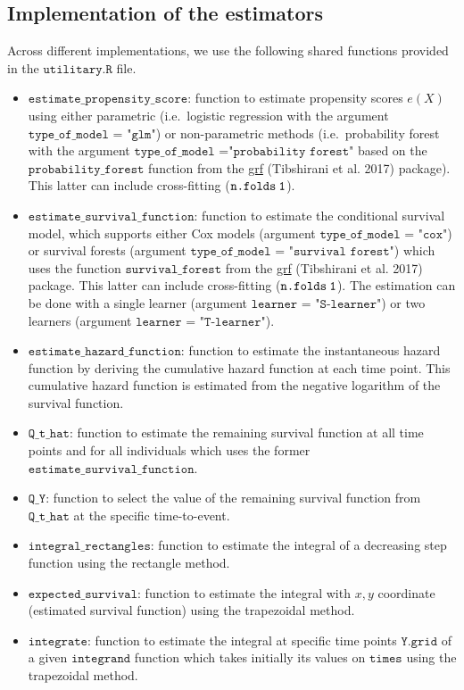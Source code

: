 \documentclass[
  11pt,
  a4paper,
]{article}
\theoremstyle{plain}
\theoremstyle{plain}
\theoremstyle{plain}
\theoremstyle{definition}
\theoremstyle{remark}
\begin{document}
\subsection{Implementation of the
estimators}\label{implementation-of-the-estimators}

Across different implementations, we use the following shared functions
provided in the \(\texttt{utilitary.R}\) file.

\begin{itemize}
\item
  \(\texttt{estimate\_propensity\_score}\): function to estimate
  propensity scores \(e(X)\) using either parametric (i.e.~logistic
  regression with the argument \(\texttt{type\_of\_model = "glm"}\)) or
  non-parametric methods (i.e.~probability forest with the argument
  \(\texttt{type\_of\_model ="probability forest"}\) based on the
  \(\texttt{probability\_forest}\) function from the
  \href{https:\%20//cran.r-project.org/web/packages/grf/index.html}{grf}
  (Tibshirani et al. 2017) package). This latter can include
  cross-fitting (\(\texttt{n.folds\>1}\)).
\item
  \(\texttt{estimate\_survival\_function}\): function to estimate the
  conditional survival model, which supports either Cox models (argument
  \(\texttt{type\_of\_model = "cox"}\)) or survival forests (argument
  \(\texttt{type\_of\_model = "survival forest"}\)) which uses the
  function \(\texttt{survival\_forest}\) from the
  \href{https:\%20//cran.r-project.org/web/packages/grf/index.html}{grf}
  (Tibshirani et al. 2017) package. This latter can include
  cross-fitting (\(\texttt{n.folds\>1}\)). The estimation can be done
  with a single learner (argument \(\texttt{learner = "S-learner"}\)) or
  two learners (argument \(\texttt{learner = "T-learner"}\)).
\item
  \(\texttt{estimate\_hazard\_function}\): function to estimate the
  instantaneous hazard function by deriving the cumulative hazard
  function at each time point. This cumulative hazard function is
  estimated from the negative logarithm of the survival function.
\item
  \(\texttt{Q\_t\_hat}\): function to estimate the remaining survival
  function at all time points and for all individuals which uses the
  former \(\texttt{estimate\_survival\_function}\).
\item
  \(\texttt{Q\_Y}\): function to select the value of the remaining
  survival function from \(\texttt{Q\_t\_hat}\) at the specific
  time-to-event.
\item
  \(\texttt{integral\_rectangles}\): function to estimate the integral
  of a decreasing step function using the rectangle method.
\item
  \(\texttt{expected\_survival}\): function to estimate the integral
  with \(x,y\) coordinate (estimated survival function) using the
  trapezoidal method.
\item
  \(\texttt{integrate}\): function to estimate the integral at specific
  time points \(\texttt{Y.grid}\) of a given \(\texttt{integrand}\)
  function which takes initially its values on \(\texttt{times}\) using
  the trapezoidal method.
\end{itemize}
\end{document}
